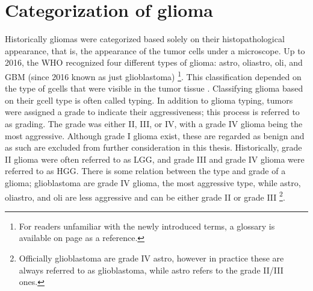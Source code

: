\section{Categorization of glioma}
Historically \glspl{glioma} were categorized based solely on their histopathological appearance, that is, the appearance of the \gls{tumor} cells under a microscope.
Up to 2016, the \gls{WHO} recognized four different types of \gls{glioma}: \gls{astro}, \gls{oliastro}, \gls{oli}, and \gls{GBM} (since 2016 known as just \gls{glioblastoma}) \footnote{For readers unfamiliar with the newly introduced terms, a glossary is available on page \pageref{glossary} as a reference.}.
This classification depended on the type of \glspl{gcell} that were visible in the \gls{tumor} tissue \autocite{louis2007who}.
Classifying \gls{glioma} based on their \gls{gcell} type is often called typing.
In addition to \gls{glioma} typing, \glspl{tumor} were assigned a grade to indicate their aggressiveness; this process is referred to as grading.
The grade was either II, III, or IV, with a grade IV \gls{glioma} being the most aggressive.
Although grade I \gls{glioma} exist, these are regarded as benign and as such are excluded from further consideration in this thesis.
Historically, grade II \gls{glioma} were often referred to as \gls{LGG}, and grade III and grade IV \gls{glioma} were referred to as \gls{HGG}.
There is some relation between the type and grade of a glioma; \gls{glioblastoma} are grade IV glioma, the most aggressive type, while \gls{astro}, \gls{oliastro}, and \gls{oli} are less aggressive and can be either grade II or grade III \footnote{Officially \gls{glioblastoma} are grade IV \gls{astro}, however in practice these are always referred to as \gls{glioblastoma}, while \gls{astro} refers to the grade II/III ones.}.

